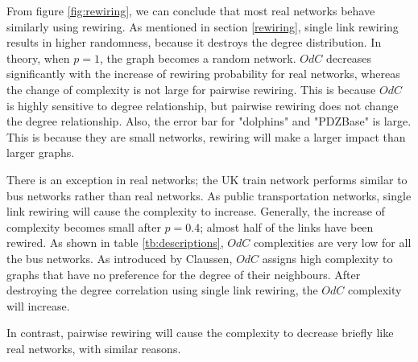\documentclass[12pt]{article}
\begin{document}
\noindent
From figure \ref{fig:rewiring}, we can conclude that most real networks behave similarly using rewiring. As mentioned in section \ref{rewiring}, single link rewiring results in higher randomness, because it destroys the degree distribution. In theory, when $p=1$, the graph becomes a random network. $OdC$ decreases significantly with the increase of rewiring probability for real networks, whereas the change of complexity is not large for pairwise rewiring. This is because $OdC$ is highly sensitive to degree relationship, but pairwise rewiring does not change the degree relationship. Also, the error bar for "dolphins" and "PDZBase" is large. This is because they are small networks, rewiring will make a larger impact than larger graphs.\par
There is an exception in real networks; the UK train network performs similar to bus networks rather than real networks. As public transportation networks, single link rewiring will cause the complexity to increase. Generally, the increase of complexity becomes small after $p=0.4$; almost half of the links have been rewired. As shown in table \ref{tb:descriptions}, $OdC$ complexities are very low for all the bus networks. As introduced by Claussen\cite{odc}, $OdC$ assigns high complexity to graphs that have no preference for the degree of their neighbours. After destroying the degree correlation using single link rewiring, the $OdC$ complexity will increase.\par
In contrast, pairwise rewiring will cause the complexity to decrease briefly like real networks, with similar reasons.
\end{document}
